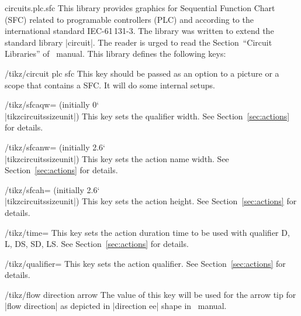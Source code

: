 \documentclass[a4paper]{ltxdoc}
\begin{document}
\begin{pgflibrary}{circuits.plc.sfc}
This library provides graphics for Sequential Function Chart (SFC) related to programable controllers (PLC) and according to the international standard IEC-61\,131-3. The library was written to extend the standard \tikzname\-library |circuit|. The reader is urged to read the Section~``Circuit Libraries'' of \tikzname\ manual.
This library defines the following keys:

\begin{key}{/tikz/circuit plc sfc}
This key should be passed as an option to a picture or a scope that contains a SFC. It will do some internal setups.
\end{key}

\begin{key}{/tikz/sfcaqw= (initially 0\char`\\|tikzcircuitssizeunit|)}
This key sets the qualifier width. See Section~\ref{sec:actions} for details.
\end{key}

\begin{key}{/tikz/sfcanw= (initially 2.6\char`\\|tikzcircuitssizeunit|)}
This key sets the action name width. See Section~\ref{sec:actions} for details.
\end{key}

\begin{key}{/tikz/sfcah= (initially 2.6\char`\\|tikzcircuitssizeunit|)}
This key sets the action height. See Section~\ref{sec:actions} for details.
\end{key}

\begin{key}{/tikz/time=}
This key sets the action duration time to be used with qualifier D, L, DS, SD, LS. See Section~\ref{sec:actions} for details.
\end{key}

\begin{key}{/tikz/qualifier=}
This key sets the action qualifier. See Section~\ref{sec:actions} for details.
\end{key}

\begin{stylekey}{/tikz/flow direction arrow}
The value of this key will be used for the arrow tip for |flow direction| as depicted in |direction ee| shape in \tikzname\ manual.
\end{stylekey}
\end{pgflibrary}
\end{document}
